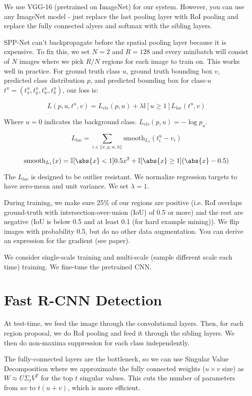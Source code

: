 \documentclass[a4paper]{article}
\begin{document}
We use VGG-16 (pretrained on ImageNet) for our system. However, you can use any
ImageNet model - just replace the last pooling layer with RoI pooling and
replace the fully connected alyers and softmax with the sibling layers.

SPP-Net can't backpropagate before the spatial pooling layer because it is
expensive. To fix this, we set $N = 2$ and $R = 128$ and every minibatch will
consist of $N$ images where we pick $R/N$ regions for each image to train on.
This works well in practice. For ground truth class $u$, ground
truth bounding box $v$, predicted class distribution $p$, and predicted
bounding box for class-$u$ $t^{u} = (t_x^{u}, t_y^{u}, t_w^{u}, t_h^{u})$,
our loss is:

$$
L(p, u, t^u, v) = L_{cls}(p, u) + \lambda \mathbb{I}[u \geq 1] L_{loc}(t^{u}, v)
$$

Where $u = 0$ indicates the background class. $L_{cls}(p, u) = -\log p_u$.

$$
L_{loc} = \sum_{i \in \{x, y, w, h\}}{\textrm{smooth}_{L_1}(t_i^u - v_i)}
$$

$$
\textrm{smooth}_{L_1}(x) = \mathbb{I}[\abs{x} < 1] 0.5 x^2 +
\mathbb{I}[\abs{x} \geq 1] (\abs{x} - 0.5)
$$

The $L_{loc}$ is designed to be outlier resistant. We normalize regression
targets to have zero-mean and unit variance. We set $\lambda = 1$.

During training, we make sure 25\% of our regions are positive (i.e. RoI
overlaps ground-truth with intersection-over-union (IoU) of 0.5 or more)
and the rest are negative (IoU is below 0.5 and at least 0.1 (for hard example
mining)). We flip images with probability 0.5, but do no other data
augmentation. You can derive an expression for the gradient (see paper).

We consider single-scale training and multi-scale (sample different scale each
time) training. We fine-tune the pretrained CNN.

\section{Fast R-CNN Detection}
At test-time, we feed the image through the convolutional layers. Then, for each
region proposal, we do RoI pooling and feed it through the sibling layers. We
then do non-maxima suppression for each class independently.

The fully-connected layers are the bottleneck, so we can use Singular Value
Decomposition where we approximate the fully connected weights ($u \times v$
size) as $W \approx U \Sigma_t V^T$ for the top $t$ singular values. This
cuts the number of parameters from $uv$ to $t(u + v)$, which is more efficient.
\end{document}
